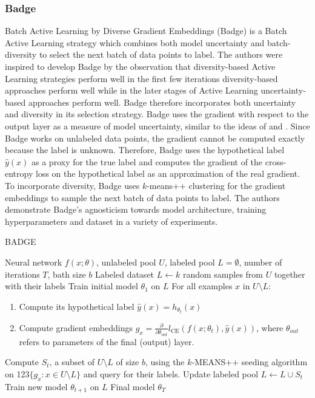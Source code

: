 \subsubsection{Badge}
Batch Active Learning by Diverse Gradient Embeddings (Badge) \cite{ash2019deep} is a Batch Active Learning strategy which combines both model uncertainty and batch-diversity to select the next batch of data points
to label. The authors were inspired to develop Badge by the observation that diversity-based Active Learning strategies perform well in the first few iterations diversity-based approaches perform well while in the
later stages of Active Learning uncertainty-based approaches perform well. Badge therefore incorporates both uncertainty and diversity in its selection strategy. Badge uses the gradient with respect to the output
layer as a measure of model uncertainty, similar to the ideas of \cite{zhang2017active} and \cite{settles2007multiple}. Since Badge works on unlabeled data points, the gradient cannot be computed exactly because
the label is unknown. Therefore, Badge uses the hypothetical label $\hat{y}(x)$ as a proxy for the true label and computes the gradient of the cross-entropy loss on the hypothetical label as an approximation of the
real gradient. To incorporate diversity, Badge uses $k$-means++ clustering \cite{arthur2007k} for the gradient embeddings to sample the next batch of data points to label. The authors demonstrate Badge's agnosticism
towards model architecture, training hyperparameters and dataset in a variety of experiments. 
\begin{algorithm}
    \caption{BADGE} \label{alg:Badge}
    \begin{algorithmic}[1]
        \Require Neural network $f(x;\theta)$, unlabeled pool $U$, labeled pool $L=\emptyset$, number of iterations $T$, bath size $b$
        \State Labeled dataset $L \leftarrow k$ random samples from $U$ together with their labels
        \State Train initial model $\theta_1$ on $L$
            \State For all examples $x$ in $U \setminus L$:
            \begin{enumerate}[leftmargin=0.8in]
                \item Compute its hypothetical label $\hat{y}(x) = h_{\theta_t}(x)$
                \item Compute gradient embeddings $g_x = \frac{\partial}{\partial \theta_{out}} l_{\text{CE}}(f(x;\theta_t),\hat{y}(x))$, where $\theta_{out}$ refers to
                parameters of the final (output) layer.
            \end{enumerate}
            \State Compute $S_t$, a subset of $U \setminus L$ of size $b$, using the $k$-MEANS++ seeding algorithm on {\color{white} 123}$\{ g_x: x \in U \setminus L\}$ and query for
            their labels.
            \State Update labeled pool $L \leftarrow L \cup S_t$
            \State Train new model $\theta_{t+1}$ on $L$
        \EndFor
        \return Final model $\theta_T$
    \end{algorithmic}
\end{algorithm}

